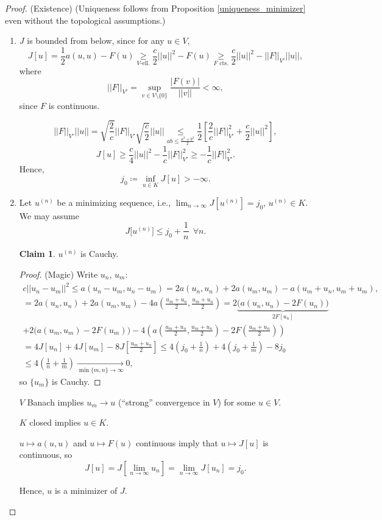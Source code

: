 \documentclass[12pt]{article}
\theoremstyle{definition}
\newtheorem*{claim*}{Claim}
\begin{document}
\begin{proof}
(Existence) (Uniqueness follows from Proposition \ref{uniqueness_minimizer} even without the topological assumptions.)

\begin{enumerate}[label=\arabic*.]
\item $J$ is bounded from below, since for any $u\in V$,
\[J[u]=\frac{1}{2}a(u,u)-F(u)\underset{V\text{-ell.}}{\geq}\frac{c}{2}||u||^2-F(u)\underset{F\text{ cts.}}{\geq}\frac{c}{2}||u||^2-||F||_{V'}||u||,\]
where
\[||F||_{V'}=\sup_{v\in V\setminus\{0\}}\frac{|F(v)|}{||v||}<\infty,\]
since $F$ is continuous.

\[||F||_{V'}||u||=\sqrt{\frac{2}{c}}||F||_{V'}\sqrt{\frac{c}{2}}||u||\underset{ab\leq\frac{a^2+b^2}{2}}{\leq}\frac{1}{2}\left[\frac{2}{c}||F||_{V'}^2+\frac{c}{2}||u||^2\right],\]
\[J[u]\geq\frac{c}{4}||u||^2-\frac{1}{c}||F||_{V'}^2\geq-\frac{1}{c}||F||_{V'}^2.\]
Hence,
\[j_0\coloneqq\inf_{u\in K}J[u]>-\infty.\]

\item Let $u^{(n)}$ be a minimizing sequence, i.e., $\lim_{n\to\infty}J[u^{(n)}]=j_0$, $u^{(n)}\in K$. We may assume
\[J\big[u^{(n)}\big]\leq j_0+\frac{1}{n}\ \ \forall n.\]

\begin{claim*}
$u^{(n)}$ is Cauchy.
\end{claim*}

\begin{proof}
(Magic) Write $u_n$, $u_m$:
\begin{multline*}
c||u_n-u_m||^2\leq a(u_n-u_m,u_n-u_m)=2a(u_n,u_n)+2a(u_m,u_m)-a(u_m+u_n,u_m+u_m),\\
=2a(u_n,u_n)+2a(u_m,u_m)-4a\left(\frac{u_m+u_n}{2},\frac{u_m+u_n}{2}\right)=2\underbrace{\big(a(u_n,u_n)-2F(u_n)\big)}_{2F[u_n]}\\
+2\big(a(u_m,u_m)-2F(u_m)\big)-4\left(a\left(\frac{u_m+u_n}{2},\frac{u_m+u_n}{2}\right)-2F\left(\frac{u_m+u_n}{2}\right)\right)\\
=4J[u_n]+4J[u_m]-8J\left[\frac{u_m+u_n}{2}\right]\leq4\left(j_0+\frac{1}{n}\right)+4\left(j_0+\frac{1}{m}\right)-8j_0\\
\leq4\left(\frac{1}{n}+\frac{1}{m}\right)\xrightarrow[\min\{m,n\}\to\infty]{}0,
\end{multline*}
so $\{u_m\}$ is Cauchy.
\end{proof}
$V$ Banach implies $u_m\rightarrow u$ (``strong'' convergence in $V$) for some $u\in V$.

$K$ closed implies $u\in K$.

$u\mapsto a(u,u)$ and $u\mapsto F(u)$ continuous imply that $u\mapsto J[u]$ is continuous, so
\[J[u]=J\left[\lim_{n\to\infty}u_n\right]=\lim_{n\to\infty}J[u_n]=j_0.\]

Hence, $u$ is a minimizer of $J$.
\end{enumerate}
\end{proof}
\end{document}
